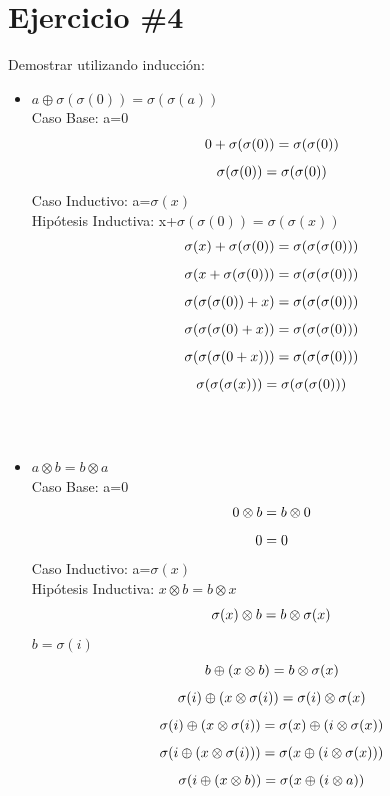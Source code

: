 \documentclass{article}
\begin{document}
\section*{Ejercicio \#4}
Demostrar utilizando inducci\'on:
\begin{itemize}
        \item{$a\oplus \sigma(\sigma(0))=\sigma(\sigma(a))$}\\
        \large{Caso Base:}
        a=0
\[
       0+\sigma(\sigma(0))=\sigma(\sigma(0))\\
\]
\[
       \sigma(\sigma(0))=\sigma(\sigma(0))\\
\]
\large{Caso Inductivo:}
a=$\sigma(x)$\\
Hipótesis Inductiva: 
x+$\sigma(\sigma(0))=\sigma(\sigma(x))$
\[
       \sigma(x)+\sigma(\sigma(0))=\sigma(\sigma(\sigma(0)))\\
\]
\[
       \sigma(x+\sigma(\sigma(0)))=\sigma(\sigma(\sigma(0)))\\
\]
\[
       \sigma(\sigma(\sigma(0))+x)=\sigma(\sigma(\sigma(0)))\\
\]
\[
       \sigma(\sigma(\sigma(0)+x))=\sigma(\sigma(\sigma(0)))\\
\]
\[
       \sigma(\sigma(\sigma(0+x)))=\sigma(\sigma(\sigma(0)))\\
\]
\[
       \sigma(\sigma(\sigma(x)))=\sigma(\sigma(\sigma(0)))\\
\]
\\\\
        \item{$a \otimes b = b \otimes a$}\\
\large{Caso Base:}
a=0
\[
       0 \otimes b = b \otimes 0\\
\]
\[
       0 = 0\\
\]
\large{Caso Inductivo:}
a=$\sigma(x)$\\
Hipótesis Inductiva:
$x \otimes b = b \otimes x$
\[
      \sigma(x) \otimes b = b \otimes \sigma(x)\\
\]
$b=\sigma(i)$
\[
     b\oplus (x \otimes b) = b \otimes \sigma(x)\\
\]
\[
     \sigma(i)\oplus (x \otimes \sigma(i)) = \sigma(i) \otimes \sigma(x)\\
\]
\[
     \sigma(i)\oplus (x \otimes \sigma(i)) = \sigma(x)\oplus(i \otimes\sigma(x)) \\
\]
\[
     \sigma(i\oplus (x \otimes \sigma(i))) = \sigma(x\oplus(i \otimes\sigma(x))) \\
\]
\[
     \sigma(i\oplus (x \otimes b)) = \sigma(x\oplus(i \otimes a)) \\
\]
\end{itemize}
\end{document}
